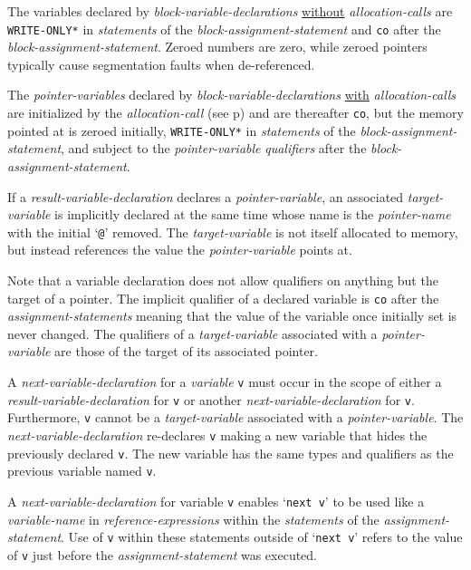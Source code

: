\documentclass[12pt]{article}
\newcommand{\pagref}[1]{p\pageref{#1}}
\newcommand{\EOL}{\penalty \exhyphenpenalty}
\begin{document}
The variables declared by {\em block-variable-declarations}
\underline{without} {\em allocation-calls}
are {\tt *WRITE-\EOL ONLY*} in {\em statements}
of the {\em block-assignment-statement} and {\tt co} after the
{\em block-assignment-statement}.
Zeroed numbers are zero, while zeroed pointers typically
cause segmentation faults when de-referenced.

The {\em pointer-variables} declared by {\em block-variable-declarations}
\underline{with} {\em allocation-calls}
are initialized by the {\em allocation-call}
(see \pagref{ALLOCATION-CALL}) and are thereafter
{\tt co}, but the memory
pointed at is zeroed initially, 
{\tt *WRITE-\EOL ONLY*} in {\em statements}
of the {\em block-assignment-statement}, and 
subject to the {\em pointer-variable} {\em qualifiers} after
the {\em block-assignment-statement}.

If a {\em result-variable-declaration} declares a {\em pointer-variable},
an associated {\em target-variable} is implicitly declared at the same time
whose name is the {\em pointer-name} with the initial `{\tt @}' removed.
The {\em target-variable} is not itself allocated to memory,
but instead references the value the {\em pointer-variable}
points at.

Note that a variable declaration does not allow
qualifiers on anything but the target of a pointer.  The implicit
qualifier of a declared variable is {\tt co} after the
{\em assignment-statements} meaning that
the value of the variable once initially set is never changed.
The qualifiers of a {\em target-variable} associated with a
{\em pointer-variable} are those of the target of
its associated pointer.

A {\em next-variable-declaration} for a {\em variable} {\tt v}
must occur in the scope of either a {\em result-variable-declaration}
for {\tt v} or another {\em next-variable-declaration} for {\tt v}.
Furthermore, {\tt v} cannot be a {\em target-variable} associated
with a {\em pointer-variable}.
The {\em next-variable-declaration} re-declares {\tt v} making a new
variable that hides the previously declared {\tt v}.  The new variable
has the same types and qualifiers as the previous variable named {\tt v}.

A {\em next-variable-declaration} for variable {\tt v} enables
`{\tt next v}' to be used like a {\em variable-name}
in {\em reference-expressions} within the {\em statements}
of the {\em assignment-statement}.  Use of
{\tt v} within these statements outside of `{\tt next v}'
refers to the value of {\tt v} just
before the {\em assignment-statement} was executed.
\end{document}
